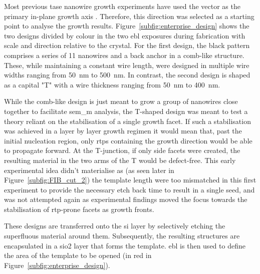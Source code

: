 Most previous \acs{tase} nanowire growth experiments have used the  vector as the primary in-plane growth axis \cite{Brunelli2019, Knoedler2017, Borg2017, Schmid2015}. Therefore, this direction was selected as a starting point to analyse the growth results. Figure~\ref{subfig:enterprise_design} shows the two designs divided by colour in the two \acf{ebl} exposures during fabrication with scale and direction relative to the crystal. For the first design, the black pattern comprises a series of \num{11} nanowires and a back anchor in a comb-like structure. These, while maintaining a constant wire length, were designed in multiple wire widths ranging from \qty{50}{\nano\metre} to \qty{500}{\nano\metre}. In contrast, the second design is shaped as a capital "T" with a wire thickness ranging from \qty{50}{\nano\metre} to \qty{400}{\nano\metre}. 

While the comb-like design is just meant to grow a group of nanowires close together to facilitate \acf{sem_m} analysis, the T-shaped design was meant to test a theory reliant on the stabilisation of a single  growth facet. If such a stabilisation was achieved in a layer by layer growth regimen it would mean that, past the initial nucleation region, only \acs{rtp}s containing the growth direction would be able to propagate forward. At the T-junction, if only  side facets were created, the resulting material in the two arms of the T would be defect-free. This early experimental idea didn't materialise as (as seen later in Figure~\ref{subfig:FIB_cut_2}) the template length were too mismatched in this first experiment to provide the necessary etch back time to result in a single seed, and was not attempted again as experimental findings moved the focus towards the stabilisation of \acs{rtp}-prone  facets as growth fronts.

These designs are transferred onto the \acl{si} layer by selectively etching the superfluous material around them. Subsequently, the resulting structures are encapsulated in a \acs{sio2} layer that forms the template. \acs{ebl} is then used to define the area of the template to be opened (in red in Figure~\ref{subfig:enterprise_design}).

